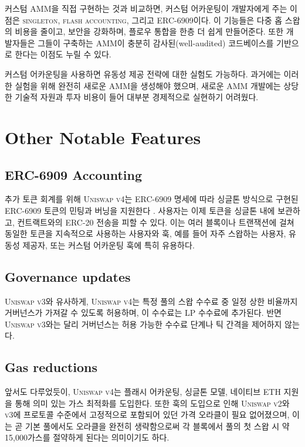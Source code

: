 \documentclass[sigconf,nonacm,prologue,table]{acmart}
\numberwithin{equation}{section}
\theoremstyle{definition}
\theoremstyle{remark}
\begin{document}
커스텀 AMM을 직접 구현하는 것과 비교하면, 커스텀 어카운팅이 개발자에게 주는 이점은 \textsc{singleton}, \textsc{flash accounting}, 그리고 \textsc{ERC-6909}이다. 이 기능들은 다중 홉 스왑의 비용을 줄이고, 보안을 강화하며, 플로우 통합을 한층 더 쉽게 만들어준다. 또한 개발자들은 그들이 구축하는 AMM이 충분히 감사된(well-audited) 코드베이스를 기반으로 한다는 이점도 누릴 수 있다.

커스텀 어카운팅을 사용하면 유동성 제공 전략에 대한 실험도 가능하다. 과거에는 이러한 실험을 위해 완전히 새로운 AMM을 생성해야 했으며, 새로운 AMM 개발에는 상당한 기술적 자원과 투자 비용이 들어 대부분 경제적으로 실현하기 어려웠다.

\section{Other Notable Features} 
\label{other}

\subsection{ERC-6909 Accounting} 
추가 토큰 회계를 위해 \textsc{Uniswap v4}는 ERC-6909 명세에 따라 싱글톤 방식으로 구현된 ERC-6909 토큰의 민팅과 버닝을 지원한다 \cite{riley2023}. 사용자는 이제 토큰을 싱글톤 내에 보관하고, 컨트랙트와의 ERC-20 전송을 피할 수 있다. 이는 여러 블록이나 트랜잭션에 걸쳐 동일한 토큰을 지속적으로 사용하는 사용자와 훅, 예를 들어 자주 스왑하는 사용자, 유동성 제공자, 또는 커스텀 어카운팅 훅에 특히 유용하다.


\subsection{Governance updates} \label{gov}
\textsc{Uniswap v3}와 유사하게, \textsc{Uniswap v4}는 특정 풀의 스왑 수수료 중 일정 상한 비율까지 거버넌스가 가져갈 수 있도록 허용하며, 이 수수료는 LP 수수료에 추가된다. 반면 \textsc{Uniswap v3}와는 달리 거버넌스는 허용 가능한 수수료 단계나 틱 간격을 제어하지 않는다.

\subsection{Gas reductions}
앞서도 다루었듯이, \textsc{Uniswap v4}는 플래시 어카운팅, 싱글톤 모델, 네이티브 ETH 지원을 통해 의미 있는 가스 최적화를 도입한다. 또한 훅의 도입으로 인해 \textsc{Uniswap v2}와 \textsc{v3}에 프로토콜 수준에서 고정적으로 포함되어 있던 가격 오라클이 필요 없어졌으며, 이는 곧 기본 풀에서도 오라클을 완전히 생략함으로써 각 블록에서 풀의 첫 스왑 시 약 15,000가스를 절약하게 된다는 의미이기도 하다.
\end{document}

